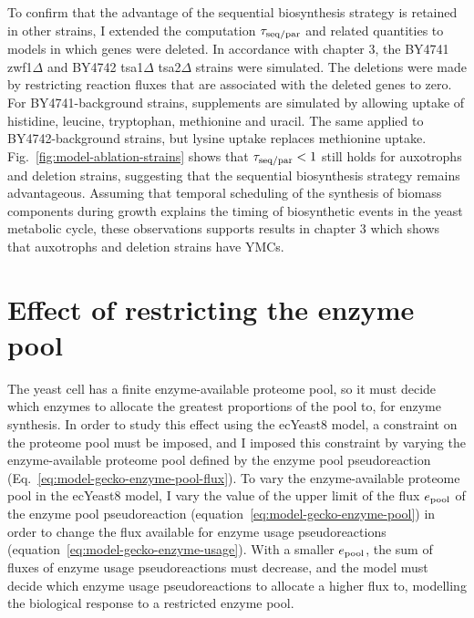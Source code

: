 
To confirm that the advantage of the sequential biosynthesis strategy is retained in other strains, I extended the computation $\tau_{\mathrm{seq}/\mathrm{par}}$ and related quantities to models in which genes were deleted.
In accordance with chapter 3, the BY4741 zwf1$\Delta$ and BY4742 tsa1$\Delta$ tsa2$\Delta$ strains were simulated.
The deletions were made by restricting reaction fluxes that are associated with the deleted genes to zero.
For BY4741-background strains, supplements are simulated by allowing uptake of histidine, leucine, tryptophan, methionine and uracil.
The same applied to BY4742-background strains, but lysine uptake replaces methionine uptake.
Fig.\ \ref{fig:model-ablation-strains} shows that $\tau_{\mathrm{seq}/\mathrm{par}} < 1$ still holds for auxotrophs and deletion strains, suggesting that the sequential biosynthesis strategy remains advantageous.
Assuming that temporal scheduling of the synthesis of biomass components during growth explains the timing of biosynthetic events in the yeast metabolic cycle, these observations supports results in chapter 3 which shows that auxotrophs and deletion strains have YMCs.


\section{Effect of restricting the enzyme pool}
\label{sec:model-pool}

The yeast cell has a finite enzyme-available proteome pool, so it must decide which enzymes to allocate the greatest proportions of the pool to, for enzyme synthesis.
In order to study this effect using the ecYeast8 model, a constraint on the proteome pool must be imposed, and I imposed this constraint by varying the enzyme-available proteome pool defined by the enzyme pool pseudoreaction (Eq.\ \ref{eq:model-gecko-enzyme-pool-flux}).
To vary the enzyme-available proteome pool in the ecYeast8 model,
I vary the value of the upper limit of the flux $e_{\mathrm{pool}}$ of the enzyme pool pseudoreaction (equation~\ref{eq:model-gecko-enzyme-pool}) in order to change the flux available for enzyme usage pseudoreactions (equation~\ref{eq:model-gecko-enzyme-usage}).
With a smaller $e_{\mathrm{pool}}$, the sum of fluxes of enzyme usage pseudoreactions must decrease, and the model must decide which enzyme usage pseudoreactions to allocate a higher flux to, modelling the biological response to a restricted enzyme pool.

